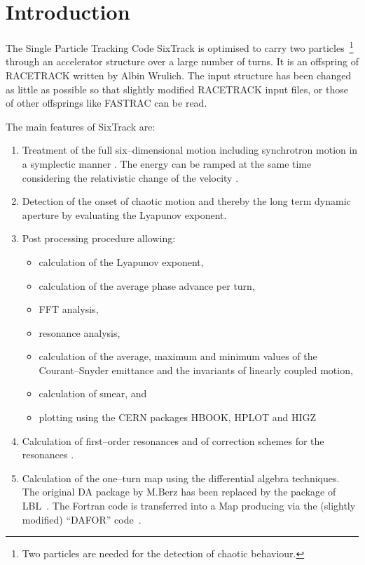 \chapter{Introduction}

The Single Particle Tracking Code SixTrack is optimised to carry two particles~\footnote{Two particles are needed for the detection of  chaotic behaviour.} through an accelerator structure over a large number of turns.
It is an offspring of RACETRACK \cite{RACETRACK} written by Albin Wrulich.
The input structure has been changed as little as possible so that slightly modified RACETRACK input files, or those of other offsprings like FASTRAC \cite{FASTRAC} can be read.

The main features of SixTrack are: \bigskip
\begin{enumerate}
    \item Treatment of the full six--dimensional motion including synchrotron motion in a symplectic manner \cite{Ripken85}. The energy can be ramped at the same time considering the relativistic change of the velocity \cite{Ripken87}.
    \item Detection of the onset of chaotic motion and thereby the long term dynamic aperture by evaluating the Lyapunov exponent.
    \item Post processing procedure allowing:
    \begin{itemize}
        \item calculation of the Lyapunov exponent,
        \item calculation of the average phase advance per turn,
        \item FFT analysis,
        \item resonance analysis,
        \item calculation of the average, maximum and minimum values of the Courant--Snyder emittance and the invariants of linearly coupled motion,
        \item calculation of smear, and
        \item plotting using the CERN packages HBOOK, HPLOT and HIGZ \cite{HBOOK,HPLOT,HIGZ}
    \end{itemize}
    \item Calculation of first--order resonances and of correction schemes for the resonances \cite{Gilbert78}.
    \item Calculation of the one--turn map using the differential algebra techniques. The original DA package by M.Berz \cite{Berz89} has been replaced by the package of LBL~\cite{DALIE}. The Fortran code is transferred into a Map producing via the (slightly modified) ``DAFOR'' code~\cite{DAFOR}.

\end{enumerate}

